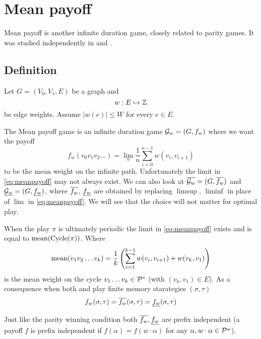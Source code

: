 \chapter{Mean payoff}

Mean payoff is another infinite duration game, closely related to parity games. It was studied independently in \cite{ehrenfeucht_positional_1979} and \cite{gurvich_cyclic_1988}.

\section{Definition}
Let $G=(V_0,V_1,E)$ be a graph and
\[
    w : E \mapsto \mathbb{Z}
\]
be edge weights. Assume $|w(e)| \leq W$ for every $e \in E$.

The Mean payoff game is an infinite duration game $\mathcal{G}_w=(G,f_w)$ where we want the payoff
\begin{equation}
    f_w (v_0v_1v_2 \ldots) = \lim_n \frac{1}{n} \sum_{i=0}^{n-1} w(v_i,v_{i+1}) \label{eq:meanpayoff}
\end{equation}
to be the mean weight on the infinite path. Unfortunately the limit in \eqref{eq:meanpayoff} may not always exist.
We can also look at $\overline{\mathcal{G}_w}=(G,\overline{f_w})$ and $\underline{\mathcal{G}_w}=(G,\underline{f_w})$, where $\overline{f_w}$, $\underline{f_w}$ are obtained by replacing $\limsup$, $\liminf$ in place of $\lim$ in \eqref{eq:meanpayoff}. We will see that the choice will not matter for optimal play. %

When the play $\pi$ is ultimately periodic the limit in \eqref{eq:meanpayoff} exists and is equal to $\operatorname*{mean}(\operatorname{Cycle}(\pi))$. Where
\begin{equation}
    \operatorname*{mean}(v_1 v_2 \ldots v_k) = \frac{1}{k} \left( \sum_{i=1}^{k-1} w(v_i, v_{i+1}) + w(v_k, v_1) \right) \label{eq:mean}
\end{equation}
is the mean weight on the cycle $v_1 \ldots v_k \in \mathcal{P}^{*}$ (with $(v_k,v_1) \in E$).
As a consequence when both  and  play finite memory starategies $(\sigma,\tau)$
\[
    f_w(\sigma,\tau) = \overline{f_w}(\sigma,\tau) = \underline{f_w}(\sigma,\tau)
\]

Just like the parity winning condition both $\overline{f_w},\underline{f_w}$ are prefix independent (a payoff $f$ is prefix independent if $f(\alpha) = f(w \cdot \alpha)$ for any $\alpha, w \cdot \alpha \in \mathcal{P}^\omega$).

